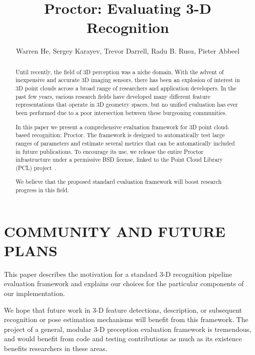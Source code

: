 \documentclass[a4paper, 10pt, conference]{ieeeconf}      %
\title{\LARGE \bf
Proctor: Evaluating 3-D Recognition
}
\author{Warren He, Sergey Karayev, Trevor Darrell, Radu B. Rusu, Pieter
  Abbeel}
\begin{document}
\maketitle
\thispagestyle{empty}
\pagestyle{empty}

\begin{abstract}


Until recently, the field of 3D perception was a niche domain. With the advent
of inexpensive and accurate 3D imaging sensors, there has been an explosion of
interest in 3D point clouds across a broad range of researchers and application
developers. In the past few years, various research fields have developed
many different feature representations that operate in 3D geometry spaces, but
no unified evaluation has ever been performed due to a poor intersection between
these burgeoning communities.

In this paper we present a comprehensive evaluation framework for 3D point
cloud-based recognition: Proctor.
The framework is designed to automatically test large ranges of
parameters and estimate several metrics that can be automatically included in
future publications. To encourage its use, we release the entire Proctor
infrastructure under a permissive BSD license, linked to the Point Cloud
Library (PCL) project~\cite{PCL}.


We believe that the proposed standard evaluation framework will boost
research progress in this field.

\end{abstract}







\section{COMMUNITY AND FUTURE PLANS}

This paper describes the motivation for a standard 3-D recognition pipeline
evaluation framework and explains our choices for the particular components of
our implementation.

We hope that future work in 3-D feature detections, description,
or subsequent recognition or pose estimation mechanisms will benefit
from this framework.
The project of a general, modular 3-D preception evaluation framework is
tremendous, and would benefit from code and testing contributions as much as its
existence benefits researchers in these areas.
\end{document}
